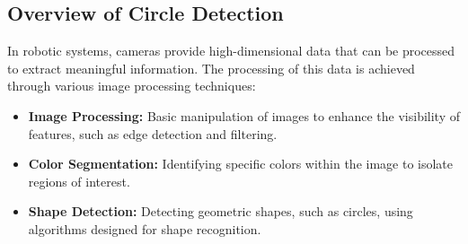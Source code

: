 \documentclass{article}
\begin{document}
	\subsection{Overview of Circle Detection}
	In robotic systems, cameras provide high-dimensional data that can be processed to extract meaningful information. The processing of this data is achieved through various image processing techniques:
	\begin{itemize}
		\item \textbf{Image Processing:} Basic manipulation of images to enhance the visibility of features, such as edge detection and filtering.
		\item \textbf{Color Segmentation:} Identifying specific colors within the image to isolate regions of interest.
		\item \textbf{Shape Detection:} Detecting geometric shapes, such as circles, using algorithms designed for shape recognition.
	\end{itemize}
	
\end{document}
